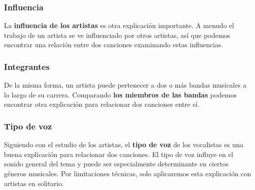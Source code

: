 \subsubsection*{Influencia}

La \textbf{influencia de los artistas} es otra explicación importante. A menudo el trabajo de un artista se ve influenciado por otros artistas, así que podemos encontrar una relación entre dos canciones examinando estas influencias.

\subsubsection*{Integrantes}

De la misma forma, un artista puede pertenecer a dos o más bandas musicales a lo largo de su carrera. Comparando \textbf{los miembros de las bandas} podemos encontrar otra explicación para relacionar dos canciones entre sí.

\subsubsection*{Tipo de voz}

Siguiendo con el estudio de los artistas, el \textbf{tipo de voz} de los vocalistas es una buena explicación para relacionar dos canciones. El tipo de voz influye en el sonido general del tema y puede ser especialmente determinante en ciertos géneros musicales. Por limitaciones técnicas, solo aplicaremos esta explicación con artistas en solitario.